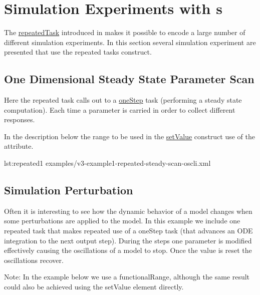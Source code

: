 \section{Simulation Experiments with s}
The \hyperref[class:repeatedTask]{repeatedTask} introduced in \LoneVtwo makes it possible to encode a large number of different simulation experiments. In this section several simulation experiment are presented that use the repeated tasks construct. 

\subsection{One Dimensional Steady State Parameter Scan}
Here the repeated task calls out to a \hyperref[class:oneStep]{oneStep} task (performing a steady state computation). Each time a parameter is carried in order to collect different responses. 

In the description below the range to be used in the \hyperref[class:setValue]{setValue} construct use of the  attribute.


{lst:repeated1}
{examples/v3-example1-repeated-steady-scan-oscli.xml}

\subsection{Simulation Perturbation}
Often it is interesting to see how the dynamic behavior of a model changes when some perturbations are applied to the model. In this example we include one repeated task that makes repeated use of a oneStep task (that advances an ODE integration to the next output step). During the steps one parameter is modified effectively causing the oscillations of a model to stop. Once the value is reset the oscillations recover. 

Note: In the example below we use a functionalRange, although the same result could also be achieved using the setValue element directly.


